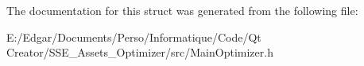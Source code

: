 The documentation for this struct was generated from the following file\+:\begin{DoxyCompactItemize}
\item 
E\+:/\+Edgar/\+Documents/\+Perso/\+Informatique/\+Code/\+Qt Creator/\+S\+S\+E\+\_\+\+Assets\+\_\+\+Optimizer/src/Main\+Optimizer.\+h\end{DoxyCompactItemize}
